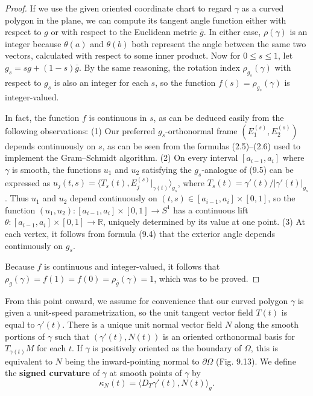 \begin{proof}
If we use the given oriented coordinate chart to regard $\gamma$ as a curved polygon in the plane, we can compute its tangent angle function either with respect to $g$ or with respect to the Euclidean metric $\bar{g}$. In either case, $\rho(\gamma)$ is an integer because $\theta(a)$ and $\theta(b)$ both represent the angle between the same two vectors, calculated with respect to some inner product. Now for $0 \le s \le 1$, let $g_s = sg + (1-s)\bar{g}$. By the same reasoning, the rotation index $\rho_{g_s}(\gamma)$ with respect to $g_s$ is also an integer for each $s$, so the function $f(s) = \rho_{g_s}(\gamma)$ is integer-valued.

In fact, the function $f$ is continuous in $s$, as can be deduced easily from the following observations: (1) Our preferred $g_s$-orthonormal frame $(E_1^{(s)}, E_2^{(s)})$ depends continuously on $s$, as can be seen from the formulas (2.5)--(2.6) used to implement the Gram--Schmidt algorithm. (2) On every interval $[a_{i-1}, a_i]$ where $\gamma$ is smooth, the functions $u_1$ and $u_2$ satisfying the $g_s$-analogue of (9.5) can be expressed as $u_j(t,s) = \langle T_s(t), E_j^{(s)}|_{\gamma(t)} \rangle_{g_s}$, where $T_s(t) = \gamma'(t)/|\gamma'(t)|_{g_s}$. Thus $u_1$ and $u_2$ depend continuously on $(t,s) \in [a_{i-1}, a_i] \times [0,1]$, so the function $(u_1, u_2) : [a_{i-1}, a_i] \times [0,1] \to S^1$ has a continuous lift $\theta : [a_{i-1}, a_i] \times [0,1] \to \mathbb{R}$, uniquely determined by its value at one point. (3) At each vertex, it follows from formula (9.4) that the exterior angle depends continuously on $g_s$.

Because $f$ is continuous and integer-valued, it follows that $\rho_g(\gamma) = f(1) = f(0) = \rho_{\bar{g}}(\gamma) = 1$, which was to be proved.
\end{proof}


From this point onward, we assume for convenience that our curved polygon $\gamma$
is given a unit-speed parametrization, so the unit tangent vector field $T(t)$ is equal
to $\gamma'(t)$. There is a unique unit normal vector field $N$ along the smooth portions
of $\gamma$ such that $(\gamma'(t), N(t))$ is an oriented orthonormal basis for $T_{\gamma(t)}M$ for each $t$.
If $\gamma$ is positively oriented as the boundary of $\Omega$, this is equivalent to $N$ being the
inward-pointing normal to $\partial\Omega$ (Fig. 9.13). We define the \textbf{signed curvature} of $\gamma$ at
smooth points of $\gamma$ by
\[
\kappa_N(t) = \langle D_T \gamma'(t), N(t) \rangle_g.
\]

